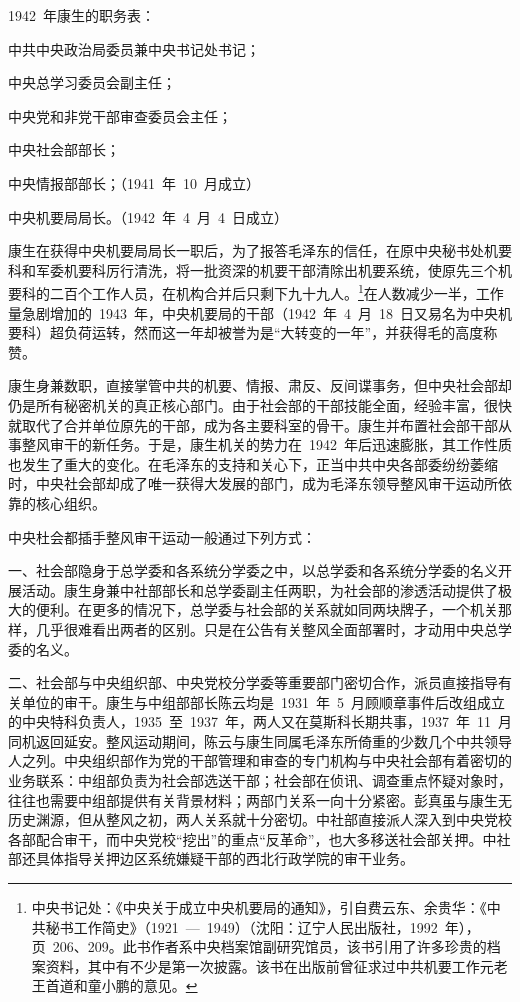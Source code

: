 1942~年康生的职务表：

中共中央政治局委员兼中央书记处书记；

中央总学习委员会副主任；

中央党和非党干部审查委员会主任；

中央社会部部长；

中央情报部部长；（1941~年~10~月成立）

中央机要局局长。（1942~年~4~月~4~日成立）

康生在获得中央机要局局长一职后，为了报答毛泽东的信任，在原中央秘书处机要科和军委机要科厉行清洗，将一批资深的机要干部清除出机要系统，使原先三个机要科的二百个工作人员，在机构合并后只剩下九十九人。\footnote{中央书记处：《中央关于成立中央机要局的通知》，引自费云东、余贵华：《中共秘书工作简史》（1921~—~1949）（沈阳：辽宁人民出版社，1992~年），页~206、209。此书作者系中央档案馆副研究馆员，该书引用了许多珍贵的档案资料，其中有不少是第一次披露。该书在出版前曾征求过中共机要工作元老王首道和童小鹏的意见。}在人数减少一半，工作量急剧增加的~1943~年，中央机要局的干部（1942~年~4~月~18~日又易名为中央机要科）超负荷运转，然而这一年却被誉为是“大转变的一年”，并获得毛的高度称赞。

康生身兼数职，直接掌管中共的机要、情报、肃反、反间谍事务，但中央社会部却仍是所有秘密机关的真正核心部门。由于社会部的干部技能全面，经验丰富，很快就取代了合并单位原先的干部，成为各主要科室的骨干。康生并布置社会部干部从事整风审干的新任务。于是，康生机关的势力在~1942~年后迅速膨胀，其工作性质也发生了重大的变化。在毛泽东的支持和关心下，正当中共中央各部委纷纷萎缩时，中央社会部却成了唯一获得大发展的部门，成为毛泽东领导整风审干运动所依靠的核心组织。

中央杜会都插手整风审干运动一般通过下列方式：

一、社会部隐身于总学委和各系统分学委之中，以总学委和各系统分学委的名义开展活动。康生身兼中社部部长和总学委副主任两职，为社会部的渗透活动提供了极大的便利。在更多的情况下，总学委与社会部的关系就如同两块牌子，一个机关那样，几乎很难看出两者的区别。只是在公告有关整风全面部署时，才动用中央总学委的名义。

二、社会部与中央组织部、中央党校分学委等重要部门密切合作，派员直接指导有关单位的审干。康生与中组部部长陈云均是~1931~年~5~月顾顺章事件后改组成立的中央特科负责人，1935~至~1937~年，两人又在莫斯科长期共事，1937~年~11~月同机返回延安。整风运动期间，陈云与康生同属毛泽东所倚重的少数几个中共领导人之列。中央组织部作为党的干部管理和审查的专门机构与中央社会部有着密切的业务联系：中组部负责为社会部选送干部；社会部在侦讯、调查重点怀疑对象时，往往也需要中组部提供有关背景材料；两部门关系一向十分紧密。彭真虽与康生无历史渊源，但从整风之初，两人关系就十分密切。中社部直接派人深入到中央党校各部配合审干，而中央党校“挖出”的重点“反革命”，也大多移送社会部关押。中社部还具体指导关押边区系统嫌疑干部的西北行政学院的审干业务。

